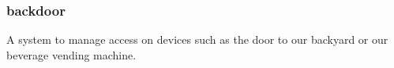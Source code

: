 \documentclass[]{resume}
\begin{document}
\begin{timeline}
\subsubsection{backdoor}
A system to manage access on devices such as the door to our backyard or our beverage vending machine.
\sectionsep

\end{timeline}
\end{document}
